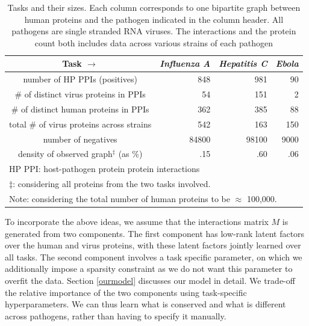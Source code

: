 \documentclass[runningheads,a4paper]{llncs}
\begin{document}
\begin{table}
\caption{Tasks and their sizes. Each column corresponds to one bipartite graph between human proteins and the pathogen indicated in the column header. All pathogens are single stranded RNA viruses. The interactions and the protein count both includes data across various strains of each pathogen}
\label{datasets}
\begin{footnotesize}
\begin{tabular}{crrr} \toprule
Task $\rightarrow$ & \textbf{\textit{Influenza A}} & \textbf{\textit{Hepatitis C}} & \textbf{\textit{Ebola}}\\ \midrule 
number of HP PPIs (positives) & 848& 981 & 90 \\\hline
\# of distinct virus proteins in PPIs & 54 & 151 & 2 \\\hline
{\# of distinct human proteins in PPIs} & 362 & 385 & 88 \\\hline
{total \# of virus proteins across strains} & 542 & 163 & 150 \\\hline
{number of negatives} & 84800 & 98100 & 9000 \\\hline
{density of observed graph$^\ddagger$ (as \%)} & .15 & .60 & .06 \\\hline
\multicolumn{4}{l}{\scriptsize{HP PPI: host-pathogen protein protein interactions}}\\
\multicolumn{4}{l}{\scriptsize{$\ddagger$: considering all proteins from the two tasks involved. }}\\
\multicolumn{4}{l}{\scriptsize{Note: considering the total number of human proteins to be $\approx$ 100,000.}}\\
\bottomrule
\end{tabular}
\end{footnotesize}
\end{table}


To incorporate the above ideas, we assume that the interactions matrix $M$ is generated from two components. 
The first component has low-rank latent factors over the human and virus proteins,
with these latent factors jointly learned over all tasks. The second component involves a task specific parameter, on which we
additionally impose a sparsity constraint as we do not want this parameter to overfit the data. Section \ref{ourmodel} discusses
our model in detail. We trade-off the relative importance of the two components using task-specific hyperparameters.
We can thus learn what is conserved and what is different across pathogens, rather than having to specify it manually. 
\end{document}
